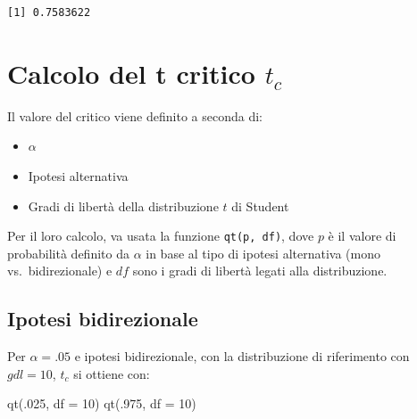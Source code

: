 \documentclass[
  italian,
  letterpaper,
  DIV=11,
  numbers=noendperiod]{scrartcl}
\newenvironment{Shaded}{\begin{snugshade}}{\end{snugshade}}
\newcommand{\AttributeTok}[1]{\textcolor[rgb]{0.40,0.45,0.13}{#1}}
\newcommand{\DecValTok}[1]{\textcolor[rgb]{0.68,0.00,0.00}{#1}}
\newcommand{\FunctionTok}[1]{\textcolor[rgb]{0.28,0.35,0.67}{#1}}
\newcommand{\NormalTok}[1]{\textcolor[rgb]{0.00,0.23,0.31}{#1}}
\newcommand{\OtherTok}[1]{\textcolor[rgb]{0.00,0.23,0.31}{#1}}
\newcommand{\SpecialCharTok}[1]{\textcolor[rgb]{0.37,0.37,0.37}{#1}}
\newcommand{\StringTok}[1]{\textcolor[rgb]{0.13,0.47,0.30}{#1}}
\providecommand{\tightlist}{%
  \setlength{\itemsep}{0pt}\setlength{\parskip}{0pt}}
\newcommand*\circled[1]{\tikz[baseline=(char.base)]{
          \node[shape=circle,draw,inner sep=1pt] (char) {{\scriptsize#1}};}}
\begin{document}
\begin{Shaded}
\end{Shaded}

\begin{verbatim}
[1] 0.7583622
\end{verbatim}

\section{\texorpdfstring{Calcolo del t critico
\(t_c\)}{Calcolo del t critico t\_c}}\label{calcolo-del-t-critico-t_c}

Il valore del critico viene definito a seconda di:

\begin{itemize}
\tightlist
\item
  \(\alpha\)
\item
  Ipotesi alternativa
\item
  Gradi di libertà della distribuzione \(t\) di Student
\end{itemize}

Per il loro calcolo, va usata la funzione \texttt{qt(p,\ df)}, dove
\(p\) è il valore di probabilità definito da \(\alpha\) in base al tipo
di ipotesi alternativa (mono vs.~bidirezionale) e \(df\) sono i gradi di
libertà legati alla distribuzione.

\subsection{Ipotesi bidirezionale}\label{ipotesi-bidirezionale-1}

Per \(\alpha = .05\) e ipotesi bidirezionale, con la distribuzione di
riferimento con \(gdl = 10\), \(t_c\) si ottiene con:

\label{annotated-cell-15}%
\begin{Shaded}
\begin{Highlighting}[]
\FunctionTok{qt}\NormalTok{(.}\DecValTok{025}\NormalTok{, }\AttributeTok{df =} \DecValTok{10}\NormalTok{) }\hspace*{\fill}\NormalTok{\circled{1}}
\FunctionTok{qt}\NormalTok{(.}\DecValTok{975}\NormalTok{, }\AttributeTok{df =} \DecValTok{10}\NormalTok{) }\hspace*{\fill}\NormalTok{\circled{2}}
\end{Highlighting}
\end{Shaded}
\end{document}

